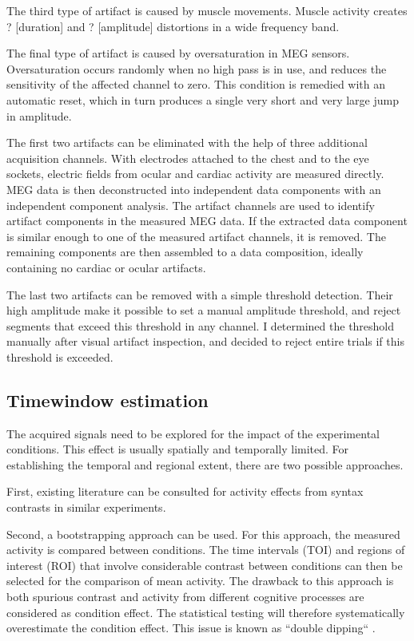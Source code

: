 The third type of artifact is caused by muscle movements.
Muscle activity creates ? [duration] and ? [amplitude] distortions in a wide frequency band.

The final type of artifact is caused by oversaturation in MEG sensors.
Oversaturation occurs randomly when no high pass is in use, and reduces the sensitivity of the affected channel to zero.
This condition is remedied with an automatic reset, which in turn produces a single very short and very large jump in amplitude.

The first two artifacts can be eliminated with the help of three additional acquisition channels.
With electrodes attached to the chest and to the eye sockets, electric fields from ocular and cardiac activity are measured directly.
MEG data is then deconstructed into independent data components with an independent component analysis.
The artifact channels are used to identify artifact components in the measured MEG data.
If the extracted data component is similar enough to one of the measured artifact channels, it is removed. 
The remaining components are then assembled to a data composition, ideally containing no cardiac or ocular artifacts.

The last two artifacts can be removed with a simple threshold detection.
Their high amplitude make it possible to set a manual amplitude threshold, and reject segments that exceed this threshold in any channel.
I determined the threshold manually after visual artifact inspection, and decided to reject entire trials if this threshold is exceeded.

\subsection{Timewindow estimation}
The acquired signals need to be explored for the impact of the experimental conditions.
This effect is usually spatially and temporally limited.
For establishing the temporal and regional extent, there are two possible approaches.

First, existing literature can be consulted for activity effects from syntax contrasts in similar experiments.

Second, a bootstrapping approach can be used.
For this approach, the measured activity is compared between conditions.
The time intervals (TOI) and regions of interest (ROI) that involve considerable contrast between conditions can then be selected for the comparison of mean activity.
The drawback to this approach is both spurious contrast and activity from different cognitive processes are considered as condition effect.
The statistical testing will therefore systematically overestimate the condition effect.
This issue is known as ``double dipping`` \cite{1.5.Kriegeskorte}.

